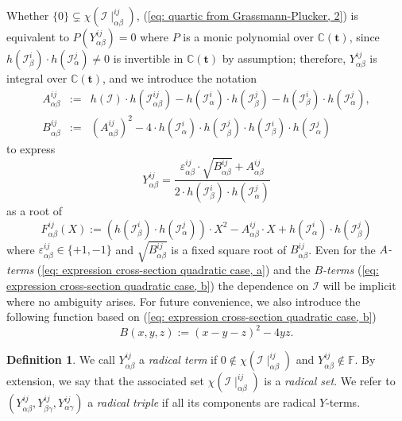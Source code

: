 \documentclass[10pt]{article}
\theoremstyle{remark}%
\theoremstyle{definition}%
\newtheorem{defn}{Definition}%
\begin{document}
Whether $\{0\}\subsetneq\chi(\mathcal{I}\mid_{\alpha\beta}^{ij})$, (\ref{eq: quartic from Grassmann-Plucker, 2}) is equivalent to $P(Y_{\alpha\beta}^{ij})=0$ where $P$ is a monic polynomial over $\mathbb{C}(\mathbf{t})$, since $h(\mathcal{I}_{\beta}^{i})\cdot h(\mathcal{I}_{\alpha}^{j})\neq0$ is invertible in $\mathbb{C}(\mathbf{t})$ by assumption; therefore, $Y_{\alpha\beta}^{ij}$ is integral over $\mathbb{C}(\mathbf{t})$, and we introduce the notation 
\begin{eqnarray}
A_{\alpha\beta}^{ij} & := & h(\mathcal{I})\cdot h(\mathcal{I}_{\alpha\beta}^{ij})-h(\mathcal{I}_{\alpha}^{i})\cdot h(\mathcal{I}_{\beta}^{j})-h(\mathcal{I}_{\beta}^{i})\cdot h(\mathcal{I}_{\alpha}^{j}),
\label{eq: expression cross-section quadratic case, a}\\
B_{\alpha\beta}^{ij} & := & \left(A_{\alpha\beta}^{ij}\right)^{2} -4\cdot h(\mathcal{I}_{\alpha}^{i})\cdot h(\mathcal{I}_{\beta}^{j})\cdot h(\mathcal{I}_{\beta}^{i})\cdot h(\mathcal{I}_{\alpha}^{j})
\label{eq: expression cross-section quadratic case, b}
\end{eqnarray}
to express 
 \begin{equation}
Y_{\alpha\beta}^{ij}=\frac{\varepsilon_{\alpha\beta}^{ij}\cdot\sqrt{B_{\alpha\beta}^{ij}}+A_{\alpha\beta}^{ij}}{2\cdot h(\mathcal{I}_{\beta}^{i})\cdot h(\mathcal{I}_{\alpha}^{j})}\label{eq: radical expression}
 \end{equation}
as a root of 
\begin{equation}
F_{\alpha\beta}^{ij}(X):=\left(h(\mathcal{I}_{\beta}^{i})\cdot h(\mathcal{I}_{\alpha}^{j})\right)\cdot X^{2}-A_{\alpha\beta}^{ij}\cdot X+h(\mathcal{I}_{\alpha}^{i})\cdot h(\mathcal{I}_{\beta}^{j})
\label{eq: polynomial h to Y}
\end{equation}
where $\varepsilon_{\alpha\beta}^{ij}\in\{+1,-1\}$ and $\sqrt{B_{\alpha\beta}^{ij}}$ is a fixed square root of $B_{\alpha\beta}^{ij}$. Even for the \textit{$A$-terms} (\ref{eq: expression cross-section quadratic case, a})
and the \textit{$B$-terms} (\ref{eq: expression cross-section quadratic case, b}) the dependence on $\mathcal{I}$ will be implicit where no ambiguity arises. 
For future convenience, we also introduce the following function based on (\ref{eq: expression cross-section quadratic case, b}) 
 \begin{equation}
B(x,y,z):=(x-y-z)^{2}-4yz.
\label{eq: B-function}
 \end{equation}
\begin{defn}
\label{def: radical triple}
We call $Y_{\alpha\beta}^{ij}$ a \emph{radical term} if $0\notin\chi(\mathcal{I}\mid_{\alpha\beta}^{ij})$ and $Y_{\alpha\beta}^{ij}\notin\mathbb{F}$. By extension, we say that the associated set $\chi(\mathcal{I}\mid_{\alpha\beta}^{ij})$ is a \emph{radical set}. 
We refer to $(Y_{\alpha\beta}^{ij},Y_{\beta\gamma}^{ij},Y_{\alpha\gamma}^{ij})$ a \emph{radical triple} if all its components are radical $Y$-terms.
\end{defn}
\end{document}
